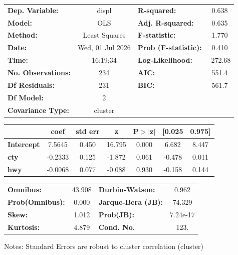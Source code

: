 \begin{center}
\begin{tabular}{lclc}
\toprule
\textbf{Dep. Variable:}    &      displ       & \textbf{  R-squared:         } &     0.638   \\
\textbf{Model:}            &       OLS        & \textbf{  Adj. R-squared:    } &     0.635   \\
\textbf{Method:}           &  Least Squares   & \textbf{  F-statistic:       } &     1.770   \\
\textbf{Date:}             & Wed, 01 Jul 2026 & \textbf{  Prob (F-statistic):} &    0.410    \\
\textbf{Time:}             &     16:19:34     & \textbf{  Log-Likelihood:    } &   -272.68   \\
\textbf{No. Observations:} &         234      & \textbf{  AIC:               } &     551.4   \\
\textbf{Df Residuals:}     &         231      & \textbf{  BIC:               } &     561.7   \\
\textbf{Df Model:}         &           2      & \textbf{                     } &             \\
\textbf{Covariance Type:}  &     cluster      & \textbf{                     } &             \\
\bottomrule
\end{tabular}
\begin{tabular}{lcccccc}
                   & \textbf{coef} & \textbf{std err} & \textbf{z} & \textbf{P$> |$z$|$} & \textbf{[0.025} & \textbf{0.975]}  \\
\midrule
\textbf{Intercept} &       7.5645  &        0.450     &    16.795  &         0.000        &        6.682    &        8.447     \\
\textbf{cty}       &      -0.2333  &        0.125     &    -1.872  &         0.061        &       -0.478    &        0.011     \\
\textbf{hwy}       &      -0.0068  &        0.077     &    -0.088  &         0.930        &       -0.158    &        0.144     \\
\bottomrule
\end{tabular}
\begin{tabular}{lclc}
\textbf{Omnibus:}       & 43.908 & \textbf{  Durbin-Watson:     } &    0.962  \\
\textbf{Prob(Omnibus):} &  0.000 & \textbf{  Jarque-Bera (JB):  } &   74.329  \\
\textbf{Skew:}          &  1.012 & \textbf{  Prob(JB):          } & 7.24e-17  \\
\textbf{Kurtosis:}      &  4.879 & \textbf{  Cond. No.          } &     123.  \\
\bottomrule
\end{tabular}
\end{center}

Notes: \newline
 [1] Standard Errors are robust to cluster correlation (cluster)
